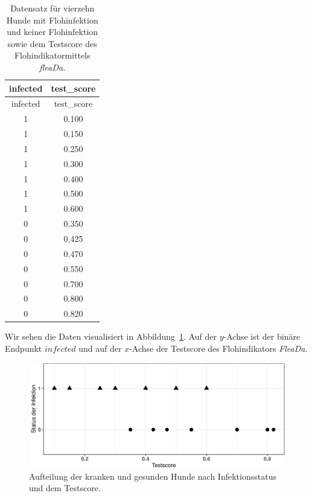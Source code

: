 \documentclass[
  letterpaper,
]{scrbook}
\begin{document}
\hypertarget{tbl-data-roc-1}{}
\begin{longtable}[]{@{}cc@{}}
\caption{\label{tbl-data-roc-1}Datensatz für vierzehn Hunde mit
Flohinfektion und keiner Flohinfektion sowie dem Testscore des
Flohindikatormittels \emph{fleaDa}.}\tabularnewline
\toprule()
infected & test\_score \\
\midrule()
\endfirsthead
\toprule()
infected & test\_score \\
\midrule()
\endhead
1 & 0.100 \\
1 & 0.150 \\
1 & 0.250 \\
1 & 0.300 \\
1 & 0.400 \\
1 & 0.500 \\
1 & 0.600 \\
0 & 0.350 \\
0 & 0.425 \\
0 & 0.470 \\
0 & 0.550 \\
0 & 0.700 \\
0 & 0.800 \\
0 & 0.820 \\
\bottomrule()
\end{longtable}

Wir sehen die Daten visualisiert in Abbildung~\ref{fig-labels-roc1}. Auf
der \(y\)-Achse ist der binäre Endpunkt \(infected\) und auf der
\(x\)-Achse der Testscore des Flohindikators \emph{FleaDa}.

\begin{figure}

{\centering \includegraphics{./stat-tests-diagnostic_files/figure-pdf/fig-labels-roc1-1.pdf}

}

\caption{\label{fig-labels-roc1}Aufteilung der kranken und gesunden
Hunde nach Infektionsstatus und dem Testscore.}

\end{figure}
\end{document}
